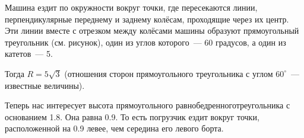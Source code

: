 \begin{itemize}

\itA Машина ездит по окружности вокруг точки, где пересекаются линии, перпендикулярные переднему и заднему колёсам, проходящие через их центр. Эти линии вместе с отрезком между колёсами машины образуют прямоугольный треугольник (см. рисунок), один из углов которого~— 60 градусов, а один из катетов~— \SI{5}{}.

Тогда $R = 5 \sqrt{3}$ (отношения сторон прямоугольного треугольника с углом $60^\circ$~— известные величины).

\begin{center}
\end{center}

\itB Теперь нас интересует высота прямоугольного равнобедренного\linebreak треугольника с основанием \SI{1.8}{}. Она равна \SI{0.9}{}. То есть погрузчик ездит вокруг точки, расположенной на \SI{0.9}{} левее, чем середина его левого борта.


\end{itemize}
